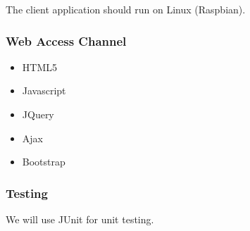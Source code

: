 The client application should run on Linux (Raspbian).

\subsubsection{Web Access Channel}
\begin{itemize}
	\item HTML5
	\item Javascript
	\item JQuery
	\item Ajax
	\item Bootstrap
\end{itemize}

\subsubsection{Testing}
We will use JUnit for unit testing.